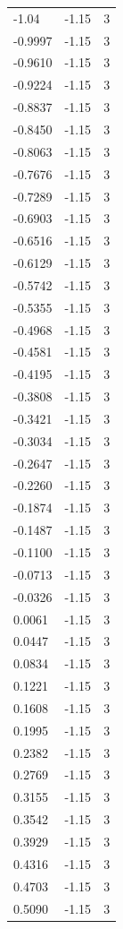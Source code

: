 \begin{longtable}{lrr}
  -1.04 & -1.15 & 3 \\
  -0.9997 & -1.15 & 3 \\
  -0.9610 & -1.15 & 3 \\
  -0.9224 & -1.15 & 3 \\
  -0.8837 & -1.15 & 3 \\
  -0.8450 & -1.15 & 3 \\
  -0.8063 & -1.15 & 3 \\
  -0.7676 & -1.15 & 3 \\
  -0.7289 & -1.15 & 3 \\
  -0.6903 & -1.15 & 3 \\
  -0.6516 & -1.15 & 3 \\
  -0.6129 & -1.15 & 3 \\
  -0.5742 & -1.15 & 3 \\
  -0.5355 & -1.15 & 3 \\
  -0.4968 & -1.15 & 3 \\
  -0.4581 & -1.15 & 3 \\
  -0.4195 & -1.15 & 3 \\
  -0.3808 & -1.15 & 3 \\
  -0.3421 & -1.15 & 3 \\
  -0.3034 & -1.15 & 3 \\
  -0.2647 & -1.15 & 3 \\
  -0.2260 & -1.15 & 3 \\
  -0.1874 & -1.15 & 3 \\
  -0.1487 & -1.15 & 3 \\
  -0.1100 & -1.15 & 3 \\
  -0.0713 & -1.15 & 3 \\
  -0.0326 & -1.15 & 3 \\
  0.0061 & -1.15 & 3 \\
  0.0447 & -1.15 & 3 \\
  0.0834 & -1.15 & 3 \\
  0.1221 & -1.15 & 3 \\
  0.1608 & -1.15 & 3 \\
  0.1995 & -1.15 & 3 \\
  0.2382 & -1.15 & 3 \\
  0.2769 & -1.15 & 3 \\
  0.3155 & -1.15 & 3 \\
  0.3542 & -1.15 & 3 \\
  0.3929 & -1.15 & 3 \\
  0.4316 & -1.15 & 3 \\
  0.4703 & -1.15 & 3 \\
  0.5090 & -1.15 & 3 \\

\end{longtable}
